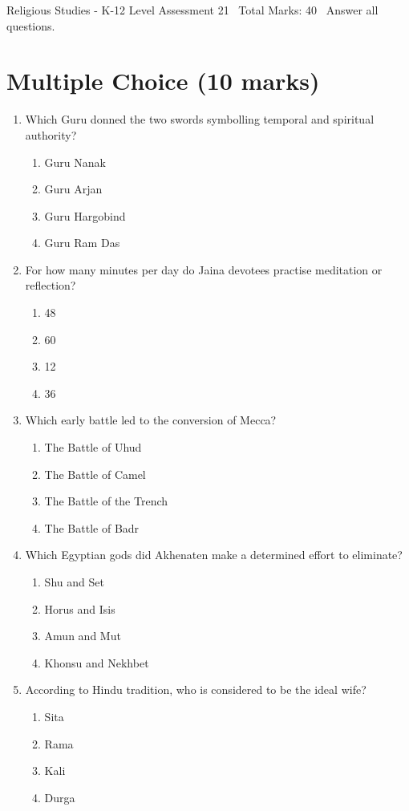 \documentclass[12pt]{article}
\begin{document}
\begin{center}
Religious Studies - K-12 Level Assessment 21 \
Total Marks: 40 \
Answer all questions.
\end{center}

\section*{Multiple Choice (10 marks)}
\begin{enumerate}[label=\arabic*.]
\item Which Guru donned the two swords symbolling temporal and spiritual authority?
\begin{enumerate}[label=(\alph*)]
    \item Guru Nanak
    \item Guru Arjan
    \item Guru Hargobind
    \item Guru Ram Das
\end{enumerate}
\item For how many minutes per day do Jaina devotees practise meditation or reflection?
\begin{enumerate}[label=(\alph*)]
    \item 48
    \item 60
    \item 12
    \item 36
\end{enumerate}
\item Which early battle led to the conversion of Mecca?
\begin{enumerate}[label=(\alph*)]
    \item The Battle of Uhud
    \item The Battle of Camel
    \item The Battle of the Trench
    \item The Battle of Badr
\end{enumerate}
\item Which Egyptian gods did Akhenaten make a determined effort to eliminate?
\begin{enumerate}[label=(\alph*)]
    \item Shu and Set
    \item Horus and Isis
    \item Amun and Mut
    \item Khonsu and Nekhbet
\end{enumerate}
\item According to Hindu tradition, who is considered to be the ideal wife?
\begin{enumerate}[label=(\alph*)]
    \item Sita
    \item Rama
    \item Kali
    \item Durga
\end{enumerate}
\end{enumerate}
\end{document}
